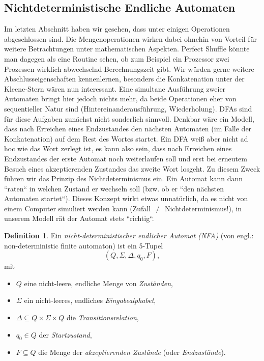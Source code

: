 \documentclass[11pt, a4paper]{article}
\theoremstyle{definition}
\newtheorem{definition}{Definition}[section]
\theoremstyle{plain}
\numberwithin{equation}{section}
\begin{document}
\subsection{Nichtdeterministische Endliche Automaten}\label{sec:regular_nfa}
Im letzten Abschnitt haben wir gesehen, dass unter einigen Operationen abgeschlossen sind. Die Mengenoperationen wirken dabei ohnehin von Vorteil für weitere Betrachtungen unter mathematischen Aspekten. Perfect Shuffle könnte man dagegen als eine Routine sehen, ob zum Beispiel ein Prozessor zwei Prozessen wirklich abwechselnd Berechnungszeit gibt. Wir würden gerne weitere Abschlusseigenschaften kennenlernen, besonders die Konkatenation unter der Kleene-Stern wären nun interessant. Eine simultane Ausführung zweier Automaten bringt hier jedoch nichts mehr, da beide Operationen eher von sequentieller Natur sind (Hintereinanderausführung, Wiederholung). DFAs sind für diese Aufgaben zunächst nicht sonderlich sinnvoll. Denkbar wäre ein Modell, dass nach Erreichen eines Endzustandes den nächsten Automaten (im Falle der Konkatenation) auf dem Rest des Wortes startet. Ein DFA weiß aber nicht ad hoc wie das Wort zerlegt ist, es kann also sein, dass nach Erreichen eines Endzustandes der erste Automat noch weiterlaufen soll und erst bei erneutem Besuch eines akzeptierenden Zustandes das zweite Wort losgeht. Zu diesem Zweck führen wir das Prinzip des Nichtdeterminismus ein. Ein Automat kann dann ``raten`` in welchen Zustand er wechseln soll (bzw. ob er ``den nächsten Automaten startet``). Dieses Konzept wirkt etwas unnatürlich, da es nicht von einem Computer simuliert werden kann (Zufall $\neq$ Nichtdeterminismus!), in unserem Modell rät der Automat stets ``richtig``.
\begin{definition}
	Ein \textit{nicht-deterministischer endlicher Automat (NFA)} (von engl.: non-deterministic finite automaton) ist ein 5-Tupel
	$$
		(Q, \Sigma, \Delta, q_0, F),
	$$
	mit
	\begin{itemize}
		\item $Q$ eine nicht-leere, endliche Menge von \textit{Zuständen},
		\item $\Sigma$ ein nicht-leeres, endliches \textit{Eingabealphabet},
		\item $\Delta \subseteq Q \times \Sigma \times Q$ die \textit{Transitionsrelation},
		\item $q_0 \in Q$ der \textit{Startzustand},
		\item $F \subseteq Q$ die Menge der \textit{akzeptierenden Zustände} (oder \textit{Endzustände}).
	\end{itemize}
\end{definition}
\end{document}
